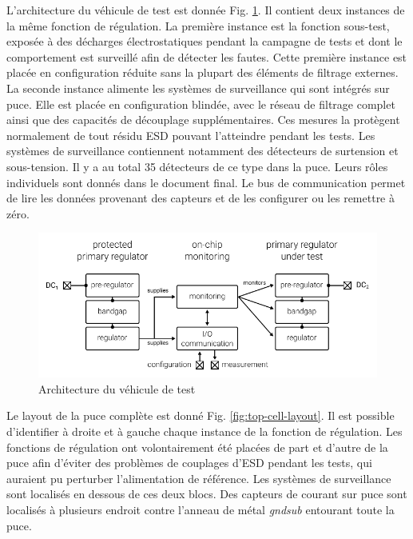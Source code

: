 L'architecture du véhicule de test est donnée Fig. \ref{architecture_testchip}.
Il contient deux instances de la même fonction de régulation.
La première instance est la fonction sous-test, exposée à des décharges électrostatiques pendant la campagne de tests et dont le comportement est surveillé afin de détecter les fautes.
Cette première instance est placée en configuration réduite sans la plupart des éléments de filtrage externes.
La seconde instance alimente les systèmes de surveillance qui sont intégrés sur puce.
Elle est placée en configuration blindée, avec le réseau de filtrage complet ainsi que des capacités de découplage supplémentaires.
Ces mesures la protègent normalement de tout résidu ESD pouvant l'atteindre pendant les tests.
Les systèmes de surveillance contiennent notamment des détecteurs de surtension et sous-tension.
Il y a au total 35 détecteurs de ce type dans la puce.
Leurs rôles individuels sont donnés dans le document final.
Le bus de communication permet de lire les données provenant des capteurs et de les configurer ou les remettre à zéro.

\begin{figure}[h]
  \centering
  \includegraphics{src/1/figures/architecture_testchip.pdf}
  \caption{Architecture du véhicule de test}
  \label{architecture_testchip}
\end{figure}

Le layout de la puce complète est donné Fig. \ref{fig:top-cell-layout}.
Il est possible d'identifier à droite et à gauche chaque instance de la fonction de régulation.
Les fonctions de régulation ont volontairement été placées de part et d'autre de la puce afin d'éviter des problèmes de couplages d'ESD pendant les tests, qui auraient pu perturber l'alimentation de référence.
Les systèmes de surveillance sont localisés en dessous de ces deux blocs.
Des capteurs de courant sur puce sont localisés à plusieurs endroit contre l'anneau de métal \textit{gndsub} entourant toute la puce.

